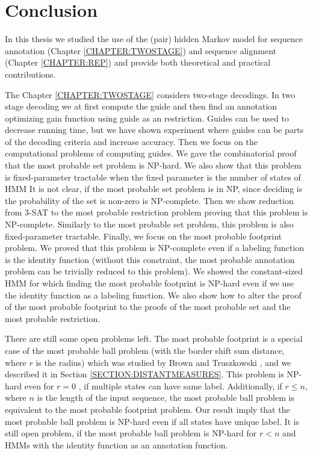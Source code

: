 \chapter{Conclusion}

In this thesis we studied the use of the (pair) hidden Markov model for
sequence annotation (Chapter \ref{CHAPTER:TWOSTAGE}) and sequence alignment
(Chapter \ref{CHAPTER:REP}) and provide both theoretical and practical
contributions.

The Chapter \ref{CHAPTER:TWOSTAGE} considers two-stage decodings. In two stage
decoding we at first compute the guide and then find an annotation optimizing
gain function using guide as an restriction. Guides can be used to decrease
running time, but we have shown experiment where guides can be parts of the
decoding criteria and increase accuracy. Then we focus on the computational problems of computing guides.
We gave the combinatorial proof that the most probable set problem is NP-hard.
We also show that this problem is fixed-parameter tractable when the fixed
parameter is the number of states of HMM It is not clear, if the most probable
set problem is in NP, since deciding is the probability of the set is non-zero
is NP-complete. Then we show reduction from 3-SAT to the most probable
restriction problem proving that this problem is NP-complete. Similarly to the
most probable set problem, this problem is also fixed-parameter tractable.
Finally, we focus on the most probable footprint problem. We proved that this
problem is NP-complete even if a labeling function is the identity function
(without this constraint, the most probable annotation problem can be trivially
reduced to this problem). We showed the constant-sized HMM for which finding
the most probable footprint is NP-hard even if we use the identity function as
a labeling function. We also show how to alter the proof of the most probable
footprint to the proofs of the most probable set and the most probable
restriction. 

There are still some open problems left. The most probable footprint is a
special case of the most probable ball problem (with the border shift sum
distance, where $r$ is the radius) which was studied by Brown and
Truszkowski \cite{Brown2010}, and we described it in Section
\ref{SECTION:DISTANTMEASURES}.  This problem is NP-hard even for $r=0$
\cite{Brown2010}, if multiple states can have same label. Additionally, if
$r\leq n$, where $n$ is the length of the input sequence, the most probable
ball problem is equivalent to the most probable footprint problem. Our result
imply that the most probable ball problem is NP-hard even if all states have
unique label. It is still open problem, if the most probable ball problem is
NP-hard for $r<n$ and HMMs with the identity function as an annotation
function. 

